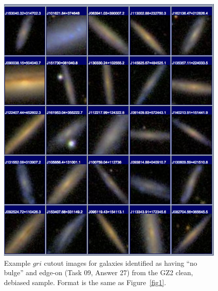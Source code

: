 \documentclass[useAMS,usenatbib]{mn2e}
\begin{document}
\newpage
\clearpage
\begin{figure}
\includegraphics[angle=0,width=7.0in]{figures/gallery/noedgeonbulge.png}
\caption{Example $gri$ cutout images for galaxies identified as having ``no bulge'' and edge-on (Task 09, Answer 27) from the GZ2 clean, debiased sample. Format is the same as Figure~\ref{fig1}.}
\end{figure}
\end{document}
